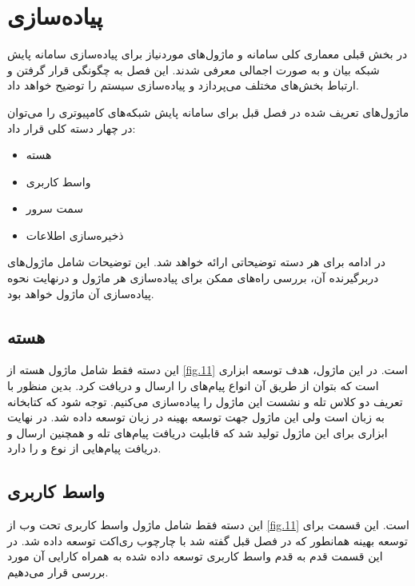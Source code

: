 \chapter{پیاده‌سازی}

در بخش قبلی معماری کلی سامانه و ماژول‌های موردنیاز برای پیاده‌سازی سامانه پایش شبکه بیان و به صورت اجمالی معرفی شدند. این فصل به چگونگی قرار گرفتن و ارتباط بخش‌های مختلف می‌پردازد و پیاده‌سازی سیستم را توضیح خواهد داد.


ماژول‌های تعریف شده در فصل قبل برای سامانه پایش شبکه‌های کامپیوتری را می‌توان در چهار دسته کلی قرار داد: 

\begin{itemize}
    \item هسته 
    \item واسط کاربری 
    \item سمت سرور
    \item ذخیره‌سازی اطلاعات


\end{itemize}

در ادامه برای هر دسته توضیحاتی ارائه خواهد شد. این توضیحات شامل ماژول‌های دربرگیرنده آن، بررسی راه‌های ممکن برای پیاده‌سازی هر ماژول و درنهایت نحوه پیاده‌سازی آن ماژول خواهد بود. 


\section{هسته }

این دسته فقط شامل ماژول هسته  از \cref{fig.11} است. در این ماژول، هدف توسعه ابزاری است که بتوان از طریق آن انواع پیام‌های  را ارسال و دریافت کرد. بدین منظور با تعریف دو کلاس تله و نشست این ماژول را پیاده‌سازی می‌کنیم. توجه شود که کتابخانه  به زبان  است ولی این ماژول جهت توسعه بهینه در زبان  توسعه داده شد. در نهایت ابزاری برای این ماژول تولید شد که قابلیت دریافت پیام‌های تله و همچنین ارسال و دریافت پیام‌هایی از نوع   و  را دارد.

\newpage

\section{واسط کاربری}

این دسته فقط شامل ماژول واسط کاربری تحت وب از \cref{fig.11} است. این قسمت برای توسعه بهینه همانطور که در فصل قبل گفته شد با چارچوب ری‌اکت توسعه داده شد. در این قسمت قدم به قدم واسط کاربری توسعه داده شده به همراه کارایی آن مورد بررسی قرار می‌دهیم.


